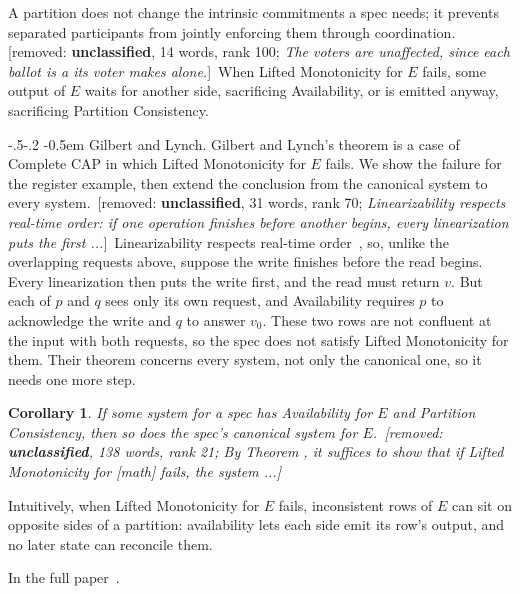 \documentclass[sigconf]{cidr-2027}
\makeatletter
\newtheorem{corollary}{Corollary}
\theoremstyle{remark}
\renewcommand\paragraph{\@startsection{paragraph}{4}{\z@}%
  {-.5\baselineskip \@plus -2\p@ \@minus -.2\p@}%
  {-0.5em}%
  {\normalfont\bfseries}}
\newcommand{\commitments}{commitments\xspace}
\newif\ifshowrv \showrvfalse
\newcommand{\rv}[1]{\ifshowrv\textsuperscript{\textcolor{magenta}{\textbf{R#1}}}\fi}
\newcommand{\proofinfull}{\par\pushQED{\qed}\normalfont\topsep2\p@\relax
  \trivlist\item[\@proofindent\hskip\labelsep{\@proofnamefont\proofname\@addpunct{.}}]%
  \ignorespaces In the full paper~\cite{hellerstein2026completecalmfull}.%
  \popQED\endtrivlist\@endpefalse}
\newcommand{\removednote}[1]{{\color{cutred}\footnotesize\,[removed: #1]\,}}
\makeatother
\begin{document}
A partition does not change the intrinsic \commitments a spec needs; it
prevents separated participants from jointly enforcing them through
coordination. \removednote{\textbf{unclassified}, 14 words, rank 100; \textit{The voters are unaffected, since each ballot is a its voter makes alone.}} \textcolor{newblue}{When Lifted Monotonicity for $E$ fails, some output of
$E$ waits for another side, sacrificing Availability, or is emitted
anyway, sacrificing Partition Consistency.}

\paragraph{Gilbert and Lynch.}
Gilbert and Lynch's theorem is a case of Complete CAP in which Lifted
Monotonicity for $E$ fails. We show the failure for the register example, then
extend the conclusion from the canonical system to every system. \removednote{\textbf{unclassified}, 31 words, rank 70; \textit{Linearizability respects real-time order: if one operation finishes before another begins, every linearization puts the first ...}} \textcolor{newblue}{Linearizability
respects real-time order~\cite{herlihy1990linearizability}, so, unlike the
overlapping requests above,\rv{10} suppose the write finishes before the read begins.} \textcolor{newblue}{Every linearization then puts the write
first, and the read must return $v$.} But each of $p$ and $q$ sees only its own
request, and Availability requires $p$ to acknowledge the write and $q$ to
answer $v_0$. These two rows are not confluent at the input with both
requests, so the spec does not satisfy Lifted Monotonicity for them. Their theorem concerns
every system, not only the canonical one, so it needs one more step.

\begin{corollary}
\label{cor:complete-cap-any-system}
If some system for a spec has Availability for $E$ and Partition Consistency,
then so does the spec's canonical system for $E$. \removednote{\textbf{unclassified}, 138 words, rank 21; \textit{By Theorem , it suffices to show that if Lifted Monotonicity for [math] fails, the system ...}}
\end{corollary}











\textcolor{newblue}{Intuitively, when Lifted Monotonicity for $E$ fails, inconsistent rows of $E$
can sit on opposite sides of a partition:
availability lets each side emit its row's output, and no later state can
reconcile them.} \textcolor{newblue}{\proofinfull}
\end{document}
